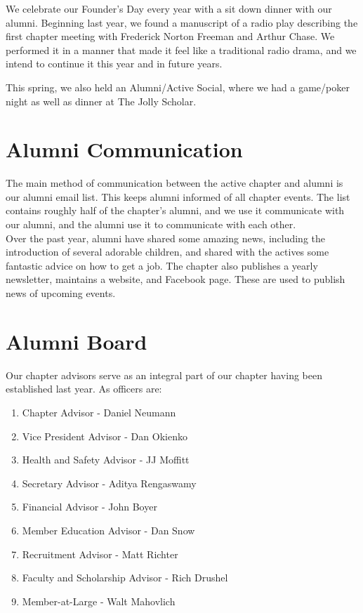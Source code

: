     We celebrate our Founder’s Day every year with a sit down dinner with our alumni. Beginning last year, we found a manuscript of a radio play describing the first chapter meeting with Frederick Norton Freeman and Arthur Chase. We performed it in a manner that made it feel like a traditional radio drama, and we intend to continue it this year and in future years.
    
    This spring, we also held an Alumni/Active Social, where we had a game/poker night as well as dinner at The Jolly Scholar.
    
  \section*{Alumni Communication}
    The main method of communication between the active chapter and alumni is our alumni email list. This keeps alumni informed of all chapter events. The list contains roughly half of the chapter’s alumni, and we use it communicate with our alumni, and the alumni use it to communicate with each other. \\

    Over the past year, alumni have shared some amazing news, including the introduction of several adorable children, and shared with the actives some fantastic advice on how to get a job. The chapter also publishes a yearly newsletter, maintains a website, and Facebook page. These are used to publish news of upcoming events.
    
  \section*{Alumni Board}
    Our chapter advisors serve as an integral part of our chapter having been established last year. As officers are:
      \begin{enumerate}
       \item Chapter Advisor - Daniel Neumann
       \item Vice President Advisor - Dan Okienko
       \item Health and Safety Advisor - JJ Moffitt
       \item Secretary Advisor - Aditya Rengaswamy
	   \item Financial Advisor - John Boyer
       \item Member Education Advisor - Dan Snow
       \item Recruitment Advisor - Matt Richter
       \item Faculty and Scholarship Advisor - Rich Drushel
       \item Member-at-Large - Walt Mahovlich
       
      \end{enumerate}

